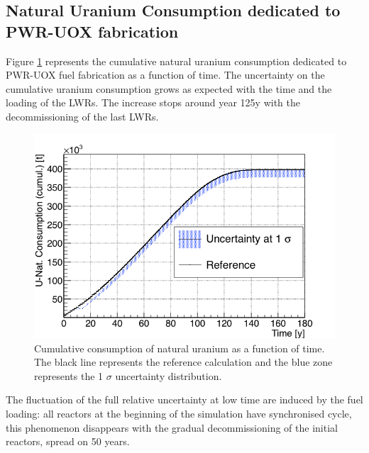 \documentclass{anstrans}
\begin{document}

\subsection{Natural Uranium Consumption dedicated to PWR-UOX fabrication}

Figure \ref{fig:unat_full} represents the cumulative natural uranium consumption
dedicated to PWR-UOX fuel fabrication as a function of time.  The uncertainty on
the cumulative uranium consumption grows as expected with the time and the
loading of the \glspl{LWR}.  The increase stops around year 125y with the
decommissioning of the last \glspl{LWR}.

\begin{figure}[ht] %
    \centering
    \includegraphics[scale=0.35]{unat_full}
    \caption{Cumulative consumption of natural uranium as a function of time.  The black line
        represents the reference calculation and the blue zone
        represents the 1 $\sigma$ uncertainty distribution.}\label{fig:unat_full}
\end{figure}


The fluctuation of the full relative uncertainty at low time are induced by the
fuel loading: all reactors at the beginning of the simulation have synchronised
cycle, this phenomenon disappears with the gradual decommissioning of the
initial reactors, spread on 50 years.
\end{document}
